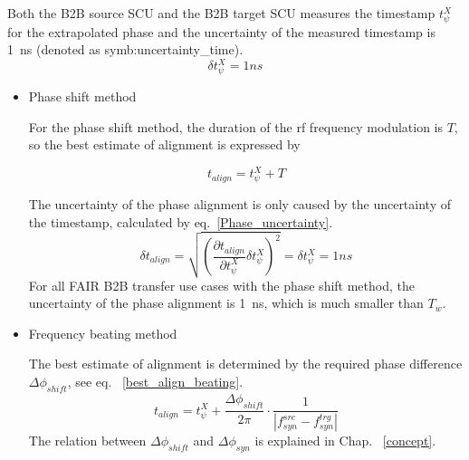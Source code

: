 Both the B2B source SCU and the B2B target SCU measures the timestamp $t_\psi^X$ for the extrapolated phase and the uncertainty of the measured timestamp is \SI{1}{ns} (denoted as \gls{symb:uncertainty_time}).  
\begin{equation} 
\delta t_\psi^X= 1ns
\label{jitter_measure_t}
\end{equation}

\begin{itemize}
\item Phase shift method

For the phase shift method, the duration of the rf frequency modulation is $T$, so the best estimate of alignment is expressed by 

\begin{equation}
t_\mathit{align} = t_{\psi}^X + T \label{Phase_win}
\end{equation}

The uncertainty of the phase alignment is only caused by the uncertainty of the timestamp, calculated by eq.~\ref{Phase_uncertainty}.
\begin{equation}
\delta t_\mathit{align} =\sqrt {(\frac {\partial t_\mathit{align}}{\partial t_{\psi}^X}\delta t_{\psi}^X)^2} =\delta t_{\psi}^X=1ns
\label{Phase_uncertainty}
\end{equation}
For all FAIR B2B transfer use cases with the phase shift method, the uncertainty of the phase alignment is \SI{1}{ns}, which is much smaller than $T_\mathit{w}$.

\item Frequency beating method

The best estimate of alignment is determined by the required phase difference $\Delta \phi_\mathit{shift}$, see eq. ~\ref{best_align_beating}.
\begin{equation}
t_\mathit{align}= t_\psi^\mathit{X}+\frac{\Delta \phi_\mathit{shift}}{2\pi}\cdot\frac{1}{|f_{\mathit{syn}}^\mathit{src}-f_{\mathit{syn}}^\mathit{trg}|}
\label{best_align_beating}
\end{equation}
The relation between $\Delta \phi_\mathit{shift}$ and $\Delta \phi_\mathit{syn}$ is explained in Chap. ~\ref{concept}. 


\end{itemize}
